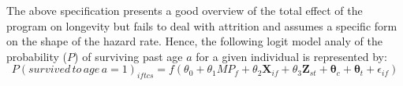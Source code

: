 The above specification presents a good overview of the total effect of the program on longevity but fails to deal with attrition and assumes a specific form on the shape of the hazard rate. Hence, the following logit model analy of the probability ($P$) of surviving past age $a$ for a given individual is represented by:
$$
P(survived\,to\,age\,a=1)_{iftcs} = f(\theta_0 + \theta_1MP_f + \theta_2\mathbf{X}_{if} + \theta_3\mathbf{Z}_{st} + \mathbf{\theta}_c + \mathbf{\theta}_t + \epsilon_{if})
$$